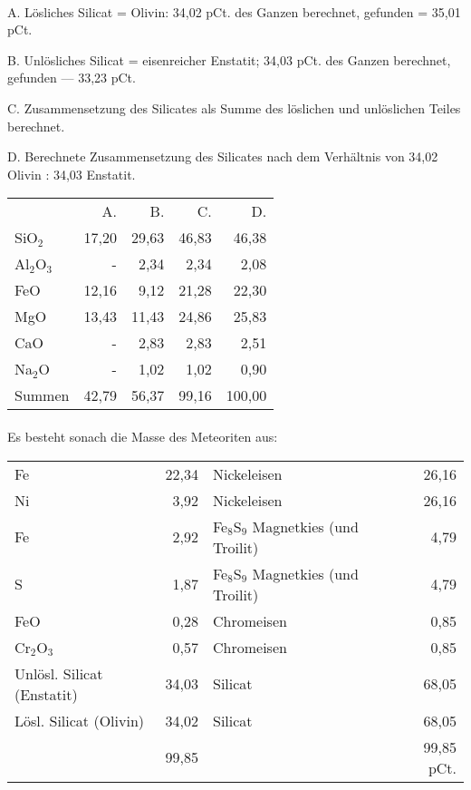 \documentclass[a4paper, 11pt, oneside]{article}
\begin{document}
\paragraph{}
A. Lösliches Silicat = Olivin: 34,02 pCt. des Ganzen berechnet, gefunden = 35,01 pCt.

B. Unlösliches Silicat = eisenreicher Enstatit; 34,03 pCt. des Ganzen berechnet, gefunden --- 33,23 pCt.

C. Zusammensetzung des Silicates als Summe des löslichen und unlöslichen Teiles berechnet.

D. Berechnete Zusammensetzung des Silicates nach dem Verhältnis von 34,02 Olivin : 34,03 Enstatit.
\begin{center}
\begin{tabular}{ l r r r r }
     & A. & B. & C. & D.\\
    SiO$_{2}$ & 17,20 & 29,63 & 46,83 & 46,38\\
    Al$_{2}$O$_{3}$ & - & 2,34 & 2,34 & 2,08\\
    FeO & 12,16 & 9,12 & 21,28 & 22,30\\
    MgO & 13,43 & 11,43 & 24,86 & 25,83\\
    CaO & - & 2,83 & 2,83 & 2,51\\
    Na$_{2}$O & - & 1,02 & 1,02 & 0,90\\
    Summen & 42,79 & 56,37 & 99,16 & 100,00\\
\end{tabular}
\end{center}
\clearpage
\paragraph{}
Es besteht sonach die Masse des Meteoriten aus:
\begin{center}
\begin{tabular}{ p{25mm} r p{35mm} r }
    Fe & 22,34 & Nickeleisen & 26,16\\
    Ni & 3,92 & Nickeleisen & 26,16\\
    Fe & 2,92& Fe$_{8}$S$_{9}$ Magnetkies (und Troilit) & 4,79\\
    S & 1,87& Fe$_{8}$S$_{9}$ Magnetkies (und Troilit) & 4,79\\
    FeO & 0,28 & Chromeisen & 0,85\\
    Cr$_{2}$O$_{3}$ & 0,57 & Chromeisen & 0,85\\
    Unlösl. Silicat (Enstatit) & 34,03 & Silicat & 68,05\\
    Lösl. Silicat (Olivin) & 34,02 & Silicat & 68,05\\
     & 99,85 & & 99,85 pCt.\\
\end{tabular}
\end{center}
\end{document}
